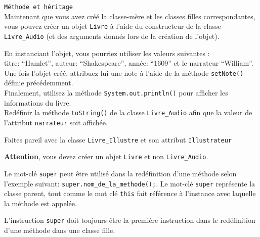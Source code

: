 \begin{Exercice}[5 minutes] \lstinline{Méthode et héritage} \\
Maintenant que vous avez créé la classe-mère et les classes filles correspondantes, vous pouvez créer un objet \lstinline{Livre} à l'aide du constructeur de la classe \lstinline{Livre_Audio} (et des arguments donnés lors de la création de l'objet).


En instanciant l'objet, vous pourriez utiliser les valeurs suivantes :\\
titre: ``Hamlet'', auteur: ``Shakespeare'', année: ``1609'' et le narrateur ``William''.\\

Une fois l'objet créé, attribuez-lui une note à l'aide de la méthode \lstinline{setNote()} définie précédemment.\\ 

Finalement, utilisez la méthode \lstinline{System.out.println()} pour afficher les informations du livre.\\

Redéfinir la méthode \lstinline{toString()} de la classe \lstinline{Livre_Audio} afin que la valeur de l'attribut \lstinline{narrateur} soit affichée.

Faites pareil avec la classe \lstinline{Livre_Illustre} et son attribut \lstinline{Illustrateur}

\begin{conseil}
\textbf{Attention}, vous devez créer un objet \lstinline{Livre} et non \lstinline{Livre_Audio}.

Le mot-clé \lstinline{super} peut être utilisé dans la redéfinition d'une méthode selon l'exemple suivant: \lstinline{super.nom_de_la_methode();}. Le mot-clé \lstinline{super} représente la classe parent, tout comme le mot clé \lstinline{this} fait référence à l'instance avec laquelle la méthode est appelée. 


L'instruction \lstinline{super} doit toujours être la première instruction dans le redéfinition d'une méthode dans une classe fille. 
\end{conseil}

\begin{solution}
	
	
\end{solution}

\end{Exercice}

